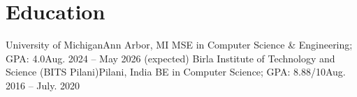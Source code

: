 \section{Education}
\vspace{-10pt}
\resumeSubheading
{University of Michigan}{Ann Arbor, MI}
{MSE in Computer Science \& Engineering;  GPA: 4.0}{Aug. 2024 -- May 2026 (expected)}
\vspace{2pt}
\resumeSubheading
{Birla Institute of Technology and Science (BITS Pilani)}{Pilani, India}
{BE in Computer Science;  GPA: 8.88/10}{Aug. 2016 -- July. 2020}
